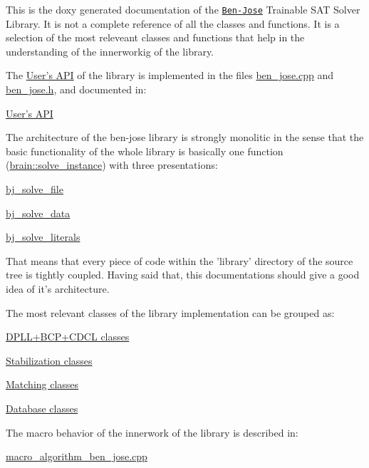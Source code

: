 This is the doxy generated documentation of the \href{https://github.com/joseluisquiroga/ben-jose}{\tt Ben-\/\+Jose} Trainable S\+A\+T Solver Library. It is not a complete reference of all the classes and functions. It is a selection of the most releveant classes and functions that help in the understanding of the innerworkig of the library.

The \hyperlink{group__docgrp___a_p_i}{User's A\+P\+I} of the library is implemented in the files \hyperlink{ben__jose_8cpp}{ben\+\_\+jose.\+cpp} and \hyperlink{ben__jose_8h}{ben\+\_\+jose.\+h}, and documented in\+:


\begin{DoxyItemize}
\item \hyperlink{group__docgrp___a_p_i}{User's A\+P\+I} 
\end{DoxyItemize}

The architecture of the ben-\/jose library is strongly monolitic in the sense that the basic functionality of the whole library is basically one function (\hyperlink{classbrain_a2daa8c1c03eea62a51a359470bb64cc7}{brain\+::solve\+\_\+instance}) with three presentations\+:


\begin{DoxyItemize}
\item \hyperlink{ben__jose_8h_a65eb23939cc4ae39654dbd93343580c8}{bj\+\_\+solve\+\_\+file} 
\item \hyperlink{ben__jose_8h_a45eef575a2ca6c6b90e0a1d998f1eb7d}{bj\+\_\+solve\+\_\+data} 
\item \hyperlink{ben__jose_8h_a2818f32df95b8d462f49a201ce371142}{bj\+\_\+solve\+\_\+literals} 
\end{DoxyItemize}

That means that every piece of code within the 'library' directory of the source tree is tightly coupled. Having said that, this documentations should give a good idea of it's architecture.

The most relevant classes of the library implementation can be grouped as\+:


\begin{DoxyItemize}
\item \hyperlink{group__docgrp___c_d_c_l__classes}{D\+P\+L\+L+\+B\+C\+P+\+C\+D\+C\+L classes} 
\item \hyperlink{group__docgrp__stab__classes}{Stabilization classes} 
\item \hyperlink{group__docgrp__matching__classes}{Matching classes} 
\item \hyperlink{group__docgrp__database__classes}{Database classes} 
\end{DoxyItemize}

The macro behavior of the innerwork of the library is described in\+:


\begin{DoxyItemize}
\item \hyperlink{macro__algorithm__ben__jose_8cpp}{macro\+\_\+algorithm\+\_\+ben\+\_\+jose.\+cpp} 
\end{DoxyItemize}